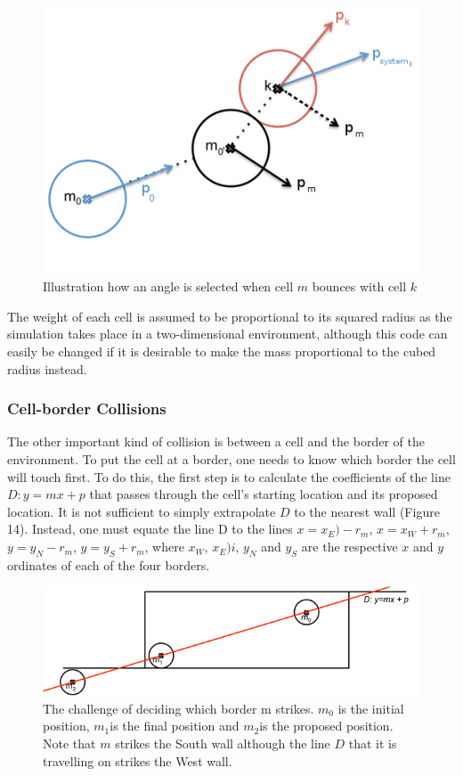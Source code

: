 \documentclass[12pt]{article}
\begin{document}
\begin{figure}[H]
\centering
\includegraphics[width=13cm]{media/cellcollide.png}
\caption{Illustration how an angle is selected when cell \(m\) bounces with cell \(k\)}
\end{figure}

The weight of each cell is assumed to be proportional to its squared radius 
as the simulation takes place in a two-dimensional environment, although 
this code can easily be changed if it is desirable to make the mass 
proportional to the cubed radius instead.

\subsubsection{Cell-border Collisions}
The other important kind of collision is between a cell and the border 
of the environment. To put the cell at a border, one needs to know which 
border the cell will touch first. To do this, the first step is to 
calculate the coefficients of the line \(D: y=mx + p\) that passes through 
the cell's starting location and its proposed location. It is not 
sufficient to simply extrapolate \(D\) to the nearest wall (Figure 14). 
Instead, one must equate the line D to the lines 
\(x = x_E) - r_m\), \(x = x_W + r_m\), \(y = y_N - r_m\), \(y = y_S + r_m\), 
where \(x_W\), \(x_E)i\), \(y_N\) and \(y_S\) are the respective \(x\) 
and \(y\) ordinates of each of the four borders.

\begin{figure}[H]
\centering
\includegraphics[width=12.98cm]{media/wall.png}
\caption{The challenge of deciding which border m 
  strikes. \(m_0\) is the initial position, \(m_1\)is the final 
  position and \(m_2\)is the proposed position. Note that \(m\) strikes 
  the South wall although the line \(D\) that it is travelling on strikes the 
West wall.}
\end{figure}
\end{document}
